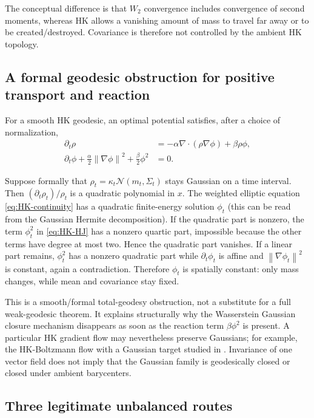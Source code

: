\documentclass[11pt]{article}
\theoremstyle{definition}
\newcommand{\cN}{\mathcal N}
\newcommand{\norm}[1]{\left\lVert #1\right\rVert}
\begin{document}
The conceptual difference is that $W_2$ convergence includes convergence of
second moments, whereas HK allows a vanishing amount of mass to travel far
away or to be created/destroyed.  Covariance is therefore not controlled by
the ambient HK topology.

\subsection{A formal geodesic obstruction for positive transport and reaction}

For a smooth HK geodesic, an optimal potential satisfies, after a choice of
normalization,
\begin{align}
 \partial_t\rho&=-\alpha\nabla\!\cdot(\rho\nabla\phi)+\beta\rho\phi,
 \label{eq:HK-continuity}\\
 \partial_t\phi+\frac\alpha2\norm{\nabla\phi}^2
 +\frac\beta2\phi^2&=0.
 \label{eq:HK-HJ}
\end{align}

Suppose formally that
$\rho_t=\kappa_t\cN(m_t,\Sigma_t)$ stays Gaussian on a time interval.  Then
$(\partial_t\rho_t)/\rho_t$ is a quadratic polynomial in $x$.  The weighted
elliptic equation \eqref{eq:HK-continuity} has a quadratic finite-energy
solution $\phi_t$ (this can be read from the Gaussian Hermite decomposition).
If the quadratic part is nonzero, the term $\phi_t^2$ in
\eqref{eq:HK-HJ} has a nonzero quartic part, impossible because the other
terms have degree at most two.  Hence the quadratic part vanishes.  If a
linear part remains, $\phi_t^2$ has a nonzero quadratic part while
$\partial_t\phi_t$ is affine and $\norm{\nabla\phi_t}^2$ is constant, again a
contradiction.  Therefore $\phi_t$ is spatially constant: only mass changes,
while mean and covariance stay fixed.

This is a smooth/formal total-geodesy obstruction, not a substitute for a full
weak-geodesic theorem.  It explains structurally why the Wasserstein Gaussian
closure mechanism disappears as soon as the reaction term $\beta\phi^2$ is
present.  A particular HK gradient flow may nevertheless preserve Gaussians;
for example, the HK-Boltzmann flow with a Gaussian target studied in
\cite{LieroMielkeTseZhu2025}.  Invariance of one vector field does not imply
that the Gaussian family is geodesically closed or closed under ambient
barycenters.

\subsection{Three legitimate unbalanced routes}
\end{document}
